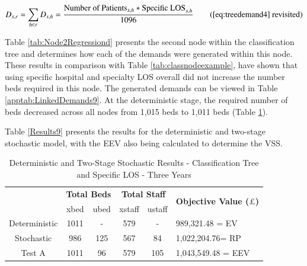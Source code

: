 \documentclass[../thesis.tex]{subfiles}
\begin{document}
\begin{equation}
        D_{s,r} = \sum\limits_{h \in r} D_{s,h} = \frac{\text{Number of Patients}_{s,h}*{\text{Specific LOS}_{s,h}}}{1096} \tag{\ref{eq:treedemand4} revisited}
\end{equation}

Table \ref{tab:Node2Regressiond} presents the second node within the classification tree and determines how each of the demands were generated within this node. These results in comparison with Table \ref{tab:classnodeexample}, have shown that using specific hospital and specialty LOS overall did not increase the number beds required in this node. The generated demands can be viewed in Table \ref{apptab:LinkedDemands9}. At the deterministic stage, the required number of beds decreased across all nodes from 1,015 beds to 1,011 beds (Table \ref{tab:Results9}). 

\begin{table}[h!]
    \centering{}
    \caption{Classification Tree Node Nine - Specific LOS}
    \label{tab:Node2Regressiond}
\end{table}

Table \ref{Results9} presents the results for the deterministic and two-stage stochastic model, with the EEV also being calculated to determine the VSS.

\begin{table}[h!]
    \centering
    \begin{tabular}{cccccl}\toprule
 & \multicolumn{2}{l}{\textbf{Total Beds}} & \multicolumn{2}{c}{\textbf{Total Staff}} & \multirow{2}{*}{\textbf{Objective Value ($\pounds$)}}\\ \cmidrule(lr){2-3} \cmidrule(lr){4-5}
 & xbed           & ubed          & xstaff         & ustaff         \\ \midrule
    Deterministic      & 1011 & - & 579 & - & 989,321.48 = EV \\ \midrule
    Stochastic & 986 & 125 & 567 & 84 & 1,022,204.76= RP \\ \midrule
    Test A & 1011 & 96 & 579 & 105 & 1,043,549.48 = EEV \\\bottomrule
    \end{tabular}
    \caption{Deterministic and Two-Stage Stochastic Results - Classification Tree and Specific LOS - Three Years}
    \label{tab:Results9}
\end{table}
\end{document}
